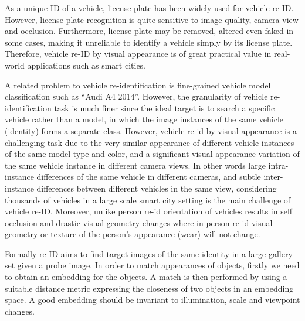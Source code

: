 \documentclass[10pt,twocolumn,letterpaper]{article}
\begin{document}
As a unique ID of a vehicle, license plate has been widely used for vehicle
re-ID. However, license plate recognition is quite sensitive to image quality,
camera view and occlusion. Furthermore, license plate may be removed,
altered even faked in some cases, making it unreliable to identify a vehicle
simply by its license plate. Therefore, vehicle re-ID by visual appearance is
of great practical value in real-world applications such as smart cities.

A related problem to vehicle re-identification is fine-grained vehicle model 
classification such as ``Audi A4 2014''\cite{yang2015compcars}.  
However, the granularity of vehicle re-identification task is much finer
since the ideal target is to search a specific vehicle rather than a model, in
which the image instances of the same vehicle (identity) forms a separate
class.
However,
vehicle re-id by visual appearance is a
challenging task due to the very similar appearance of different vehicle instances
of the same model type and color, and a significant visual appearance variation
of the same vehicle instance in different camera views. In other words
large intra-instance differences of the same vehicle in different cameras,
and subtle inter-instance differences between different vehicles in the same
view, considering thousands of vehicles in a large scale smart city setting is
the main challenge of vehicle re-ID. Moreover, unlike person re-id 
orientation of vehicles results in self occlusion and drastic visual geometry
changes where in person re-id visual geometry or texture of the person's
appearance (wear) will not change.





Formally re-ID  aims to find
target images of the same identity in a large gallery set given a probe image. 
In order to match appearances of objects, firstly we need to obtain an
embedding for the objects. A
match is then performed by using a suitable distance metric expressing the
closeness of two objects in an embedding space. A good embedding should be
invariant to illumination, scale and viewpoint changes. 
\end{document}
